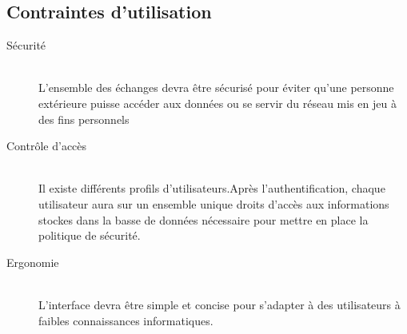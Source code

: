 \subsection{Contraintes d'utilisation}

\begin{description}
	\item [Sécurité]\hfill\\
		L'ensemble des échanges devra être sécurisé pour éviter qu'une personne extérieure puisse accéder aux données ou se servir du réseau mis en jeu à des fins personnels\\

	\item [Contrôle d'accès]\hfill\\
		 Il existe différents profils d'utilisateurs.Après l'authentification, chaque utilisateur aura sur un ensemble unique droits d'accès aux informations stockes dans la basse de données nécessaire pour mettre en place la politique de sécurité.
 	
	\item [Ergonomie]\hfill\\
		L'interface devra être simple et concise pour s'adapter à des utilisateurs à faibles connaissances informatiques.\\
\end{description}	
	
